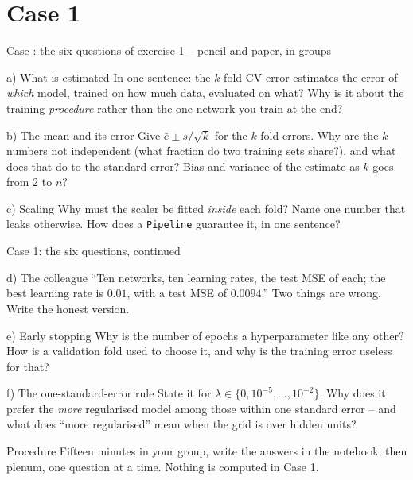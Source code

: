 \documentclass[10pt,aspectratio=169]{beamer}
\newcounter{case}
\newenvironment{case}[1][]{%
  \stepcounter{case}%
  \begin{frame}[fragile,environment=case]{Case \arabic{case}: #1}%
}{\end{frame}}
\begin{document}
\section{Case 1}
\begin{case}[the six questions of exercise 1 -- pencil and paper, in groups]
\small
\begin{block}{a) What is estimated}
In one sentence: the $k$-fold CV error estimates the error of \emph{which}
model, trained on how much data, evaluated on what?  Why is it about the
training \emph{procedure} rather than the one network you train at the end?
\end{block}
\begin{block}{b) The mean and its error}
Give $\bar e\pm s/\sqrt k$ for the $k$ fold errors.  Why are the $k$
numbers not independent (what fraction do two training sets share?), and
what does that do to the standard error?  Bias and variance of the
estimate as $k$ goes from $2$ to $n$?
\end{block}
\begin{block}{c) Scaling}
Why must the scaler be fitted \emph{inside} each fold?  Name one number
that leaks otherwise.  How does a \texttt{Pipeline} guarantee it, in one
sentence?
\end{block}
\end{case}

\begin{frame}{Case 1: the six questions, continued}
\small
\begin{block}{d) The colleague}
``Ten networks, ten learning rates, the test MSE of each; the best learning
rate is $0.01$, with a test MSE of $0.0094$.''  Two things are wrong.
Write the honest version.
\end{block}
\begin{block}{e) Early stopping}
Why is the number of epochs a hyperparameter like any other?  How is a
validation fold used to choose it, and why is the training error useless
for that?
\end{block}
\begin{block}{f) The one-standard-error rule}
State it for $\lambda\in\{0,10^{-5},\dots,10^{-2}\}$.  Why does it prefer
the \emph{more} regularised model among those within one standard error --
and what does ``more regularised'' mean when the grid is over hidden
units?
\end{block}
\begin{block}{Procedure}
Fifteen minutes in your group, write the answers in the notebook; then
plenum, one question at a time.  Nothing is computed in Case 1.
\end{block}
\end{frame}
\end{document}

